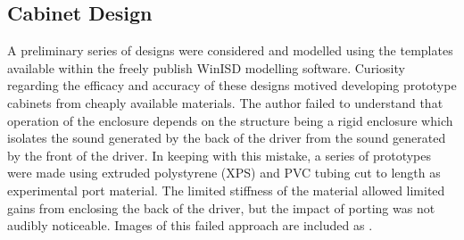 \documentclass{StdTemplate} %
\begin{document}
\subsection{Cabinet Design}
A preliminary series of designs were considered and modelled using the templates available within the freely publish WinISD modelling software. Curiosity regarding the efficacy and accuracy of these designs motived developing prototype cabinets from cheaply available materials. The author failed to understand that operation of the enclosure depends on the structure being a rigid enclosure which isolates the sound generated by the back of the driver from the sound generated by the front of the driver. In keeping with this mistake, a series of prototypes were made using extruded polystyrene (XPS) and PVC tubing cut to length as experimental port material. The limited stiffness of the material allowed limited gains from enclosing the back of the driver, but the impact of porting was not audibly noticeable. Images of this failed approach are included as .\par 
%
\end{document}
